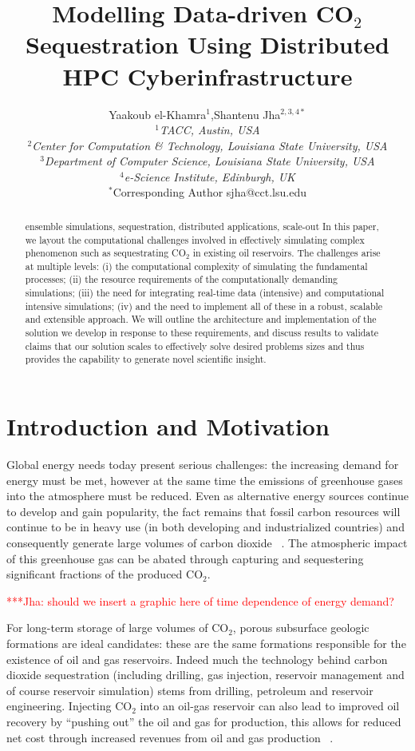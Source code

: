\documentclass{rspublic}
\title{Modelling Data-driven CO$_{2}$ Sequestration Using Distributed HPC Cyberinfrastructure}
\author[el-khamra, jha]{Yaakoub el-Khamra$^{1}$,Shantenu Jha$^{2,3,4*}$ \\
  \small{\emph{$^{1}$TACC, Austin, USA} \\ \emph{$^{2}$Center for
      Computation \& Technology, Louisiana
      State University, USA}\\
    \emph{$^{3}$Department of Computer Science, Louisiana State University, USA}\\
    \emph{$^{4}$e-Science Institute, Edinburgh, UK}} \\
{\footnotesize {\hspace{0.0 in} $^*$Corresponding Author sjha@cct.lsu.edu}}}
\newcommand{\jhanote}[1]{ {\textcolor{red} { ***Jha: #1 }}}
\newcommand{\jhanote}[1]{}
\begin{document}
\maketitle

\begin{abstract}{ensemble simulations, sequestration, distributed
    applications, scale-out} In this paper, we layout the
  computational challenges involved in effectively simulating complex
  phenomenon such as sequestrating CO$_2$ in existing oil
  reservoirs. The challenges arise at multiple levels: (i) the
  computational complexity of simulating the fundamental processes;
  (ii) the resource requirements of the computationally demanding
  simulations; (iii) the need for integrating real-time data
  (intensive) and computational intensive simulations; (iv) and the
  need to implement all of these in a robust, scalable and extensible
  approach. We will outline the architecture and implementation of the
  solution we develop in response to these requirements, and discuss
  results to validate claims that our solution scales to effectively
  solve desired problems sizes and thus provides the capability to
  generate novel scientific insight.\end{abstract}

\section{Introduction and Motivation}

Global energy needs today present serious challenges: the increasing
demand for energy must be met, however at the same time the emissions
of greenhouse gases into the atmosphere must be reduced. Even as
alternative energy sources continue to develop and gain popularity,
the fact remains that fossil carbon resources will continue to be in
heavy use (in both developing and industrialized countries) and
consequently generate large volumes of carbon dioxide
~\citep{GeoRPT}. The atmospheric impact of this greenhouse gas can be
abated through capturing and sequestering significant fractions of the
produced CO$_2$.

\jhanote{should we insert a graphic here of time dependence of energy
  demand?}

For long-term storage of large volumes of CO$_2$, porous subsurface
geologic formations are ideal candidates: these are the same
formations responsible for the existence of oil and gas
reservoirs. Indeed much the technology behind carbon dioxide
sequestration (including drilling, gas injection, reservoir management
and of course reservoir simulation) stems from drilling, petroleum and
reservoir engineering. Injecting CO$_2$ into an oil-gas reservoir can
also lead to improved oil recovery by ``pushing out'' the oil and gas
for production, this allows for reduced net cost through increased
revenues from oil and gas production ~\citep{EORBook}.
\end{document}
